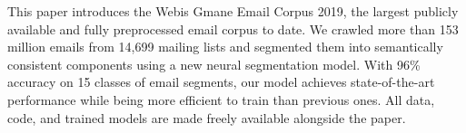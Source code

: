 This paper introduces the Webis Gmane Email Corpus 2019, the largest publicly available and fully preprocessed email corpus to date. We crawled more than 153 million emails from 14,699 mailing lists and segmented them into semantically consistent components using a new neural segmentation model. With 96\% accuracy on 15 classes of email segments, our model achieves state-of-the-art performance while being more efficient to train than previous ones. All data, code, and trained models are made freely available alongside the paper.
